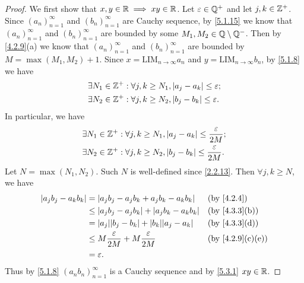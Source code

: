 \begin{proof}
  We first show that \(x, y \in \mathbb{R} \implies xy \in \mathbb{R}\).
  Let \(\varepsilon \in \mathbb{Q}^+\) and let \(j, k \in \mathbb{Z}^+\).
  Since \((a_n)_{n = 1}^\infty\) and \((b_n)_{n = 1}^\infty\) are Cauchy sequence, by \cref{5.1.15} we know that \((a_n)_{n = 1}^\infty\) and \((b_n)_{n = 1}^\infty\) are bounded by some \(M_1, M_2 \in \mathbb{Q} \setminus \mathbb{Q}^-\).
  Then by \cref{4.2.9}(a) we know that \((a_n)_{n = 1}^\infty\) and \((b_n)_{n = 1}^\infty\) are bounded by \(M = \max(M_1, M_2) + 1\).
  Since \(x = \text{LIM}_{n \to \infty} a_n\) and \(y = \text{LIM}_{n \to \infty} b_n\), by \cref{5.1.8} we have
  \begin{align*}
     & \exists N_1 \in \mathbb{Z}^+ : \forall j, k \geq N_1, \left\lvert a_j - a_k\right\rvert \leq \varepsilon; \\
     & \exists N_2 \in \mathbb{Z}^+ : \forall j, k \geq N_2, \left\lvert b_j - b_k\right\rvert \leq \varepsilon.
  \end{align*}
  In particular, we have
  \begin{align*}
     & \exists N_1 \in \mathbb{Z}^+ : \forall j, k \geq N_1, \left\lvert a_j - a_k\right\rvert \leq \dfrac{\varepsilon}{2M}; \\
     & \exists N_2 \in \mathbb{Z}^+ : \forall j, k \geq N_2, \left\lvert b_j - b_k\right\rvert \leq \dfrac{\varepsilon}{2M}.
  \end{align*}
  Let \(N = \max(N_1, N_2)\).
  Such \(N\) is well-defined since \cref{2.2.13}.
  Then \(\forall j, k \geq N\), we have
  \begin{align*}
    \abs{a_j b_j - a_k b_k} & = \abs{a_j b_j - a_j b_k + a_j b_k - a_k b_k}              &  & \by{4.2.4}      \\
                            & \leq \abs{a_j b_j - a_j b_k} + \abs{a_j b_k - a_k b_k}     &  & \by{4.3.3}[b]   \\
                            & = \abs{a_j} \abs{b_j - b_k} + \abs{b_k} \abs{a_j - a_k}    &  & \by{4.3.3}[d]   \\
                            & \leq M \dfrac{\varepsilon}{2M} + M \dfrac{\varepsilon}{2M} &  & \by{4.2.9}[c,e] \\
                            & = \varepsilon.
  \end{align*}
  Thus by \cref{5.1.8} \((a_n b_n)_{n = 1}^\infty\) is a Cauchy sequence and by \cref{5.3.1} \(xy \in \mathbb{R}\).


\end{proof}
